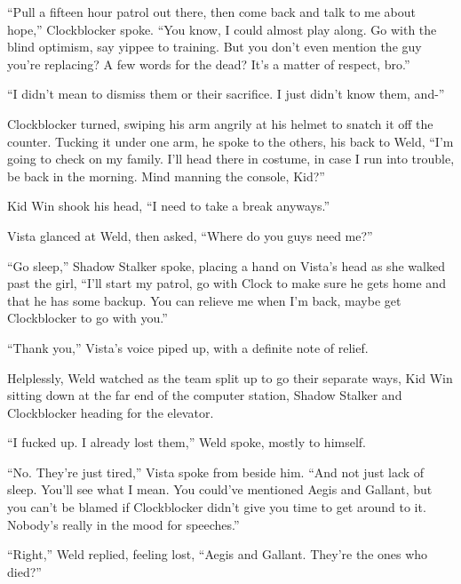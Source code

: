 ``Pull a fifteen hour patrol out there, then come back and talk to me about hope,'' Clockblocker spoke.  ``You know, I could almost play along.  Go with the blind optimism, say yippee to training.  But you don't even mention the guy you're replacing?  A few words for the dead?  It's a matter of respect, bro.''



``I didn't mean to dismiss them or their sacrifice.  I just didn't know them, and-''



Clockblocker turned, swiping his arm angrily at his helmet to snatch it off the counter.  Tucking it under one arm, he spoke to the others, his back to Weld, ``I'm going to check on my family.  I'll head there in costume, in case I run into trouble, be back in the morning.  Mind manning the console, Kid?''



Kid Win shook his head, ``I need to take a break anyways.''



Vista glanced at Weld, then asked, ``Where do you guys need me?''



``Go sleep,'' Shadow Stalker spoke, placing a hand on Vista's head as she walked past the girl, ``I'll start my patrol, go with Clock to make sure he gets home and that he has some backup.  You can relieve me when I'm back, maybe get Clockblocker to go with you.''



``Thank you,'' Vista's voice piped up, with a definite note of relief.



Helplessly, Weld watched as the team split up to go their separate ways, Kid Win sitting down at the far end of the computer station, Shadow Stalker and Clockblocker heading for the elevator.



``I fucked up.  I already lost them,'' Weld spoke, mostly to himself.



``No.  They're just tired,'' Vista spoke from beside him.  ``And not just lack of sleep.  You'll see what I mean.  You could've mentioned Aegis and Gallant, but you can't be blamed if Clockblocker didn't give you time to get around to it.  Nobody's really in the mood for speeches.''



``Right,'' Weld replied, feeling lost, ``Aegis and Gallant.  They're the ones who died?''



